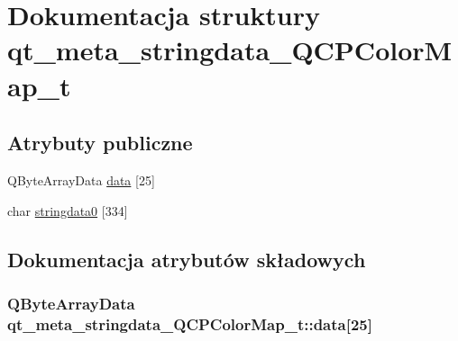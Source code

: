 \hypertarget{structqt__meta__stringdata___q_c_p_color_map__t}{}\section{Dokumentacja struktury qt\+\_\+meta\+\_\+stringdata\+\_\+\+Q\+C\+P\+Color\+Map\+\_\+t}
\label{structqt__meta__stringdata___q_c_p_color_map__t}
\subsection*{Atrybuty publiczne}
\begin{DoxyCompactItemize}
\item 
Q\+Byte\+Array\+Data \hyperlink{structqt__meta__stringdata___q_c_p_color_map__t_accab0e8d36920ac71eecd79ccaa7badf}{data} \mbox{[}25\mbox{]}
\item 
char \hyperlink{structqt__meta__stringdata___q_c_p_color_map__t_a2edec26054af0f1b2cc81406b21fca92}{stringdata0} \mbox{[}334\mbox{]}
\end{DoxyCompactItemize}


\subsection{Dokumentacja atrybutów składowych}
\subsubsection[{\texorpdfstring{data}{data}}]{\setlength{\rightskip}{0pt plus 5cm}Q\+Byte\+Array\+Data qt\+\_\+meta\+\_\+stringdata\+\_\+\+Q\+C\+P\+Color\+Map\+\_\+t\+::data\mbox{[}25\mbox{]}}\hypertarget{structqt__meta__stringdata___q_c_p_color_map__t_accab0e8d36920ac71eecd79ccaa7badf}{}\label{structqt__meta__stringdata___q_c_p_color_map__t_accab0e8d36920ac71eecd79ccaa7badf}
